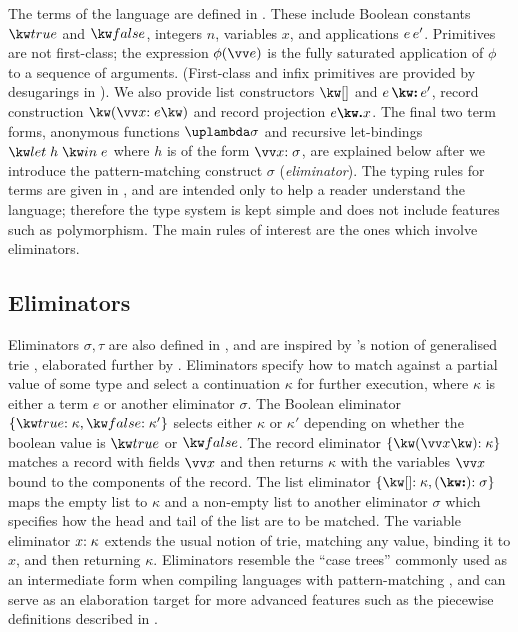 The terms of the language are defined in . These include Boolean constants $\exTrue$ and $\exFalse$, integers $n$, variables $x$, and applications ${e}\,{e'}$. Primitives are not first-class; the expression $\exAppPrim{\phi}{\vec{e}}$ is the fully saturated application of $\phi$ to a sequence of arguments. (First-class and infix primitives are provided by desugarings in ). We also provide list constructors $\exNil$ and $\exCons{e}{e'}$, record construction $\exRec{\vec{\bind{x}{e}}}$ and record projection $\exRecProj{e}{x}$. The final two term forms, anonymous functions $\exLambda{\sigma}$ and recursive let-bindings $\exLetRecMutual{h}{e}$ where $h$ is of the form $\vec{\bind{x}{\sigma}}$, are explained below after we introduce the pattern-matching construct $\sigma$ (\emph{eliminator}). The typing rules for terms are given in , and are intended only to help a reader understand the language; therefore the type system is kept simple and does not include features such as polymorphism. The main rules of interest are the ones which involve eliminators.

\subsection{Eliminators}
\label{sec:core-language:syntax-eliminator}

Eliminators $\sigma, \tau$ are also defined in , and are inspired by \citeauthor{connelly95}'s notion of generalised trie \cite{connelly95}, elaborated further by \citet{hinze00}. Eliminators specify how to match against a partial value of some type and select a continuation $\kappa$ for further execution, where $\kappa$ is either a term $e$ or another eliminator $\sigma$. The Boolean eliminator $\elimBool{\kappa}{\kappa'}$ selects either $\kappa$ or $\kappa'$ depending on whether the boolean value is $\exTrue$ or $\exFalse$. The record eliminator $\elimRec{\seq{x}}{\kappa}$ matches a record with fields $\seq{x}$ and then returns $\kappa$ with the variables $\seq{x}$ bound to the components of the record. The list eliminator $\elimList{\kappa}{\sigma}$ maps the empty list to $\kappa$ and a non-empty list to another eliminator $\sigma$ which specifies how the head and tail of the list are to be matched. The variable eliminator ${x}{:}\;{\kappa}$ extends the usual notion of trie, matching any value, binding it to $x$, and then returning $\kappa$. Eliminators resemble the ``case trees'' commonly used as an intermediate form when compiling languages with pattern-matching \cite{graf20}, and can serve as an elaboration target for more advanced features such as the piecewise definitions described in .

